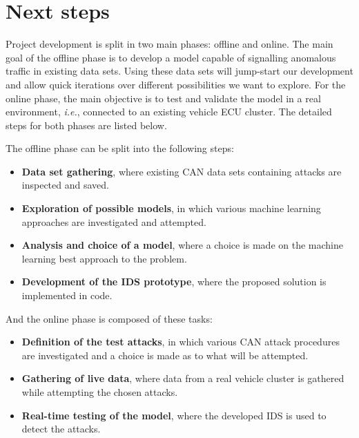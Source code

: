 \chapter{Next steps}


Project development is split in two main phases: offline and online. The main goal of the offline phase is to develop a model capable of signalling anomalous traffic in existing data sets. Using these data sets will jump-start our development and allow quick iterations over different possibilities we want to explore. For the online phase, the main objective is to test and validate the model in a real environment, \textit{i.e.}, connected to an existing vehicle ECU cluster. The detailed steps for both phases are listed below.\par

The offline phase can be split into the following steps:
\begin{itemize}
    \item \textbf{Data set gathering}, where existing CAN data sets containing attacks are inspected and saved.
    \item \textbf{Exploration of possible models}, in which various machine learning approaches are investigated and attempted.
    \item \textbf{Analysis and choice of a model}, where a choice is made on the machine learning best approach to the problem.
    \item \textbf{Development of the IDS prototype}, where the proposed solution is implemented in code.
\end{itemize}

And the online phase is composed of these tasks:
\begin{itemize}
    \item \textbf{Definition of the test attacks}, in which various CAN attack procedures are investigated and a choice is made as to what will be attempted. 
    \item \textbf{Gathering of live data}, where data from a real vehicle cluster is gathered while attempting the chosen attacks.
    \item \textbf{Real-time testing of the model}, where the developed IDS is used to detect the attacks.
\end{itemize}

